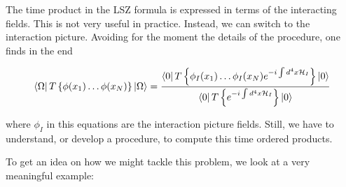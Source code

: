 \documentclass{report}
\begin{document}
The time product in the LSZ formula is expressed in terms of the interacting fields. This is not very useful in practice. Instead, we can switch to the interaction picture. Avoiding for the moment the details of the procedure, one finds in the end 

\begin{align}
    \bra{\Omega}T\left\{\phi(x_1)\ldots \phi(x_N)\right\}\ket{\Omega} = \frac{\bra{0}T\left\{\phi_I(x_1)\ldots \phi_I(x_N)e^{-i\int d^4x \mathcal{H}_I}\right\}\ket{0}}{\bra{0}T\left\{e^{-i\int d^4x \mathcal{H}_I}\right\}\ket{0}}
\end{align}

where \(\phi_I\) in this equations are the interaction picture fields. Still, we have to understand, or develop a procedure, to compute this time ordered products. 

To get an idea on how we might tackle this problem, we look at a very meaningful example: 
\end{document}
